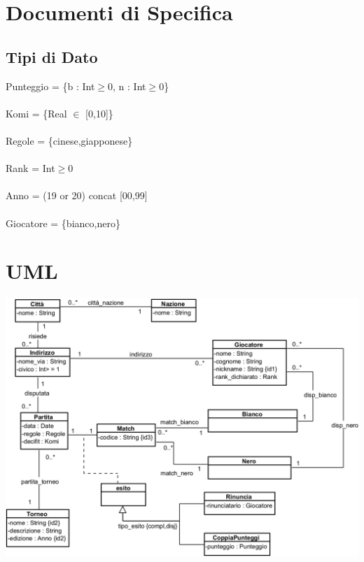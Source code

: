 \documentclass[12pt, letterpaper]{article}
\newcommand{\acc}{\\\hphantom{}\\}
\begin{document}
\section{Documenti di Specifica}
\subsection{Tipi di Dato}
Punteggio = \{b : Int$\ge$0, n : Int$\ge$0\}\acc 
Komi = \{Real $\in$ [0,10]\}\acc 
Regole = \{cinese,giapponese\}\acc
Rank = Int$\ge$0\acc 
Anno = (19 or 20) concat [00,99]\acc
Giocatore = \{bianco,nero\}
\section{UML}
\begin{center}
    \includegraphics[width=\textwidth]{images/VPP.png}
\end{center}
\end{document}
